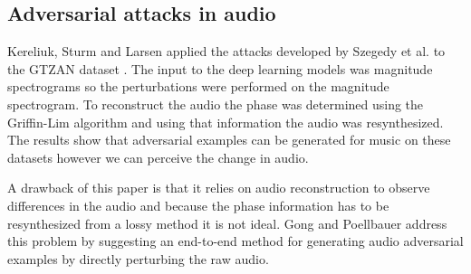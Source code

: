 \documentclass[journal,onecolumn]{IEEEtran}
\begin{document}
\subsection{Adversarial attacks in audio}

Kereliuk, Sturm and Larsen \cite{kereliuk_deep_2015} applied the attacks developed by Szegedy et al. \cite{szegedy_intriguing_2013} to the GTZAN dataset \cite{gtzan}. The input to the deep learning models was magnitude spectrograms so the perturbations were performed on the magnitude spectrogram. To reconstruct the audio the phase was determined using the Griffin-Lim algorithm and using that information the audio was resynthesized. The results show that adversarial examples can be generated for music on these datasets however we can perceive the change in audio. 

A drawback of this paper is that it relies on audio reconstruction to observe differences in the audio and because the phase information has to be resynthesized from a lossy method it is not ideal. Gong and Poellbauer address this problem by suggesting an end-to-end method for generating audio adversarial examples by directly perturbing the raw audio.
\end{document}
